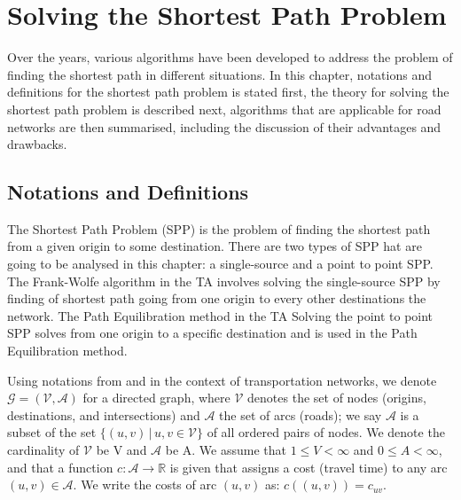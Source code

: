 \chapter{Solving the Shortest Path Problem}
\label{chap:solvingspp}

Over the years,
various algorithms have been developed 
to address the problem of finding the shortest path in different situations.
In this chapter,
notations and definitions for the shortest path problem is stated first, 
the theory for solving the shortest path problem is described next,
algorithms that are applicable for road networks are then summarised,
including the discussion of their advantages and drawbacks.


\section{Notations and Definitions}
The Shortest Path Problem (SPP) is the problem of finding the shortest path from a given origin  to some destination.
There are two types of SPP hat are going to
be analysed in this chapter:
a single-source and a point to point SPP.  
The Frank-Wolfe algorithm in the TA involves
solving the single-source SPP by finding of shortest path going from one origin to every other destinations the network.
The Path Equilibration method in the TA
Solving the point to point SPP solves from one origin to a specific destination and is used in the Path Equilibration method. 

Using notations from \citet{Klunder} and in the context
of transportation networks,
we denote $ \mathcal{G} = ( \mathcal{V}, \mathcal{A} ) $ for a directed graph,
where $ \mathcal{V} $ denotes the set of nodes (origins, destinations, and intersections)
and $ \mathcal{A} $ the set of arcs (roads);
we say $ \mathcal{A} $ is a subset of the set $ \{ (u, v)\, | \, u, v \in \mathcal{V} \} $ of all ordered pairs of nodes.
We denote the cardinality of $ \mathcal{V} $ be V and $ \mathcal{A} $ be A.
We assume that $ 1 \leq V < \infty $ and $ 0 \leq A < \infty $,
and that a function $ c : \mathcal{A} \rightarrow \mathbb{R} $ is given that assigns a cost (travel time) to any arc $ (u,v) \in \mathcal{A} $.
We write the costs of arc $(u, v)$ as: $ c((u, v)) = c_{uv} $.

